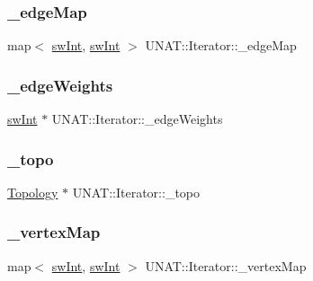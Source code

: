 \subsubsection{\texorpdfstring{\_edgeMap}{\_edgeMap}}
{\footnotesize\ttfamily map$<$ \mbox{\hyperlink{include_2swMacro_8h_a113cf5f6b5377cdf3fac6aa4e443e9aa}{sw\+Int}}, \mbox{\hyperlink{include_2swMacro_8h_a113cf5f6b5377cdf3fac6aa4e443e9aa}{sw\+Int}} $>$ U\+N\+A\+T\+::\+Iterator\+::\+\_\+edge\+Map\hspace{0.3cm}{\ttfamily [private]}}

\mbox{\label{classUNAT_1_1Iterator_a4dc20c3b10cf1acbf4d7ab9ce1d7fec2}} 
\subsubsection{\texorpdfstring{\_edgeWeights}{\_edgeWeights}}
{\footnotesize\ttfamily \mbox{\hyperlink{include_2swMacro_8h_a113cf5f6b5377cdf3fac6aa4e443e9aa}{sw\+Int}} $\ast$ U\+N\+A\+T\+::\+Iterator\+::\+\_\+edge\+Weights\hspace{0.3cm}{\ttfamily [private]}}

\mbox{\label{classUNAT_1_1Iterator_a609edbe5270c133e5883453d3d1a5e56}} 
\subsubsection{\texorpdfstring{\_topo}{\_topo}}
{\footnotesize\ttfamily \mbox{\hyperlink{classUNAT_1_1Topology}{Topology}} $\ast$ U\+N\+A\+T\+::\+Iterator\+::\+\_\+topo\hspace{0.3cm}{\ttfamily [private]}}

\mbox{\label{classUNAT_1_1Iterator_a8765de7f8e6473c0868bfc25fa40fa7a}} 
\subsubsection{\texorpdfstring{\_vertexMap}{\_vertexMap}}
{\footnotesize\ttfamily map$<$ \mbox{\hyperlink{include_2swMacro_8h_a113cf5f6b5377cdf3fac6aa4e443e9aa}{sw\+Int}}, \mbox{\hyperlink{include_2swMacro_8h_a113cf5f6b5377cdf3fac6aa4e443e9aa}{sw\+Int}} $>$ U\+N\+A\+T\+::\+Iterator\+::\+\_\+vertex\+Map\hspace{0.3cm}{\ttfamily [private]}}

